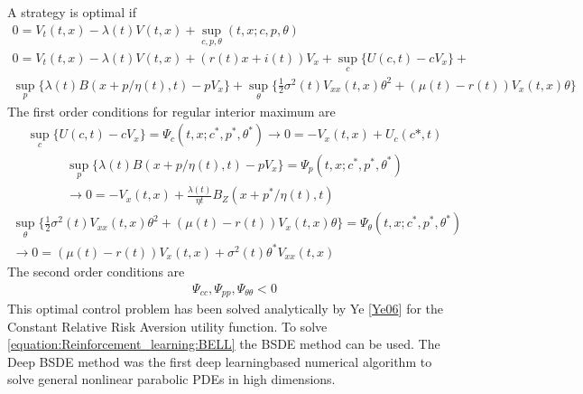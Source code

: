 \documentclass[letterpaper,10pt,english]{jupyterBook}
\begin{document}
\sphinxAtStartPar
A strategy is optimal if
\begin{gather*}
0 =V_t(t,x) -\lambda(t)V(t,x) + \sup_{c,p,\theta}(t,x;c,p,\theta)  \\
0 = V_t(t,x) -\lambda(t)V(t,x) + (r(t)x+ i(t))V_x + \sup_c\{U(c,t)-cV_x\} + \\ \sup_p\{\lambda(t)B(x + p/\eta(t),t) - pV_x\} + \sup_\theta \{ \frac{1}{2}\sigma^2(t)V_{xx}(t,x)\theta^2 +(\mu(t) - r(t))V_x(t,x)\theta\} 
\end{gather*}
\sphinxAtStartPar
The first order conditions for regular interior maximum are
\begin{equation}\label{equation:Financial_application:cons_cond}
\begin{split}\sup_c  \{ U(c,t) - cV_x\} = \Psi_c(t,x;c^*,p^*,\theta^*)  \rightarrow  0 = -V_x(t,x) + U_c(c*,t) \end{split}
\end{equation}\begin{equation}\label{equation:Financial_application:ins_cond}
\begin{split}\sup_p\{\lambda(t)B(x + p/\eta(t),t) - pV_x\} = \Psi_p(t,x;c^*,p^*,\theta^*) \\ \rightarrow 0 = -V_x(t,x) + \frac{\lambda(t)}{\eta{t}}B_Z(x + p^*/\eta(t),t)\end{split}
\end{equation}\begin{equation}\label{equation:Financial_application:inv_cond}
\begin{split}\sup_\theta \{ \frac{1}{2}\sigma^2(t)V_{xx}(t,x)\theta^2 +(\mu(t) - r(t))V_x(t,x)\theta\} = \Psi_\theta(t,x;c^*,p^*,\theta^*)\\ \rightarrow 0 = (\mu(t) -r(t))V_x(t,x) + \sigma^2(t)\theta^*V_{xx}(t,x)\end{split}
\end{equation}
\sphinxAtStartPar
The second order conditions are
\begin{equation*}
\begin{split} \Psi_{cc}, \Psi_{pp}, \Psi_{\theta \theta} < 0 \end{split}
\end{equation*}
\sphinxAtStartPar
This optimal control problem has been solved analytically by Ye {[}\hyperlink{cite.Discussion:id8}{Ye06}{]} for the Constant Relative Risk Aversion utility function. To solve \eqref{equation:Reinforcement_learning:BELL} the  BSDE method can be used. The Deep BSDE method was the first deep learning\sphinxhyphen{}based numerical algorithm to solve general nonlinear parabolic PDEs in high dimensions.
\end{document}
